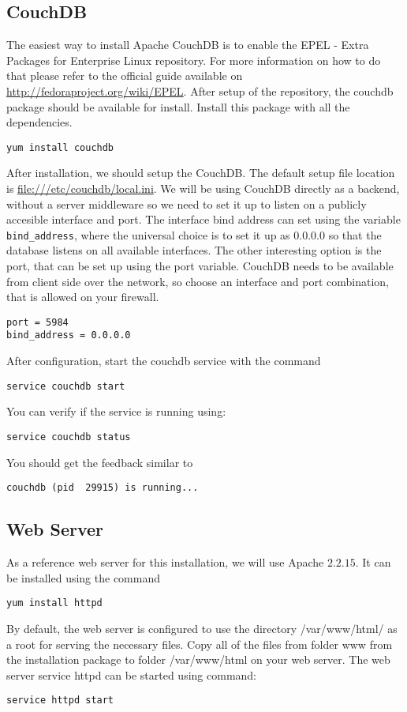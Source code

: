 \subsection{CouchDB}
The easiest way to install Apache CouchDB is to enable the EPEL - Extra Packages for
Enterprise Linux repository. For more information on how to do that please refer
to the official guide available on \url{http://fedoraproject.org/wiki/EPEL}.
After setup of the repository, the couchdb package should be available for install.
Install this package with all the dependencies.
\begin{verbatim}
yum install couchdb
\end{verbatim}
After installation, we should setup the CouchDB. The default setup file location
is \url{file:///etc/couchdb/local.ini}. We will be using CouchDB directly as a
backend, without a server middleware so we need to set it up to listen on a
publicly accesible interface and port. The interface bind address can set using the
variable \verb|bind_address|, where the universal choice is to set it up as $0.0.0.0$ so that
the database listens on all available interfaces. The other interesting option is
the port, that can be set up using the port variable. CouchDB needs to be
available from client side over the network, so choose an interface and port combination, that is allowed on your firewall.

\begin{verbatim}
port = 5984
bind_address = 0.0.0.0
\end{verbatim}

After configuration, start the couchdb service with the command
\begin{verbatim}
service couchdb start
\end{verbatim}
You can verify if the service is running using:
\begin{verbatim}
service couchdb status
\end{verbatim}
You should get the feedback similar to
\begin{verbatim}
couchdb (pid  29915) is running...
\end{verbatim}
\subsection{Web Server}
As a reference web server for this installation, we will use Apache $2.2.15$. It
can be installed using the command
\begin{verbatim}
yum install httpd
\end{verbatim}
By default, the web server is configured to use the directory /var/www/html/ as
a root for serving the necessary files. Copy all of the files from folder www from
the installation package to folder /var/www/html on your web server.
The web server service httpd can be started using command:
\begin{verbatim}
service httpd start
\end{verbatim}

